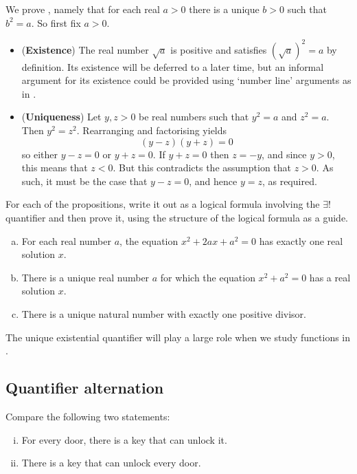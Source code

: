 \begin{example}
\label{exEveryPositiveRealHasUniqueSquareRootProof}
We prove , namely that for each real $a>0$ there is a unique $b>0$ such that $b^2=a$. So first fix $a > 0$.
\begin{itemize}
\item (\textbf{Existence}) The real number $\sqrt{a}$ is positive and satisfies $(\sqrt{a})^2=a$ by definition. Its existence will be deferred to a later time, but an informal argument for its existence could be provided using `number line' arguments as in .
\item (\textbf{Uniqueness}) Let $y,z > 0$ be real numbers such that $y^2=a$ and $z^2=a$. Then $y^2=z^2$. Rearranging and factorising yields
\[(y-z)(y+z)=0\]
so either $y-z=0$ or $y+z=0$. If $y+z=0$ then $z=-y$, and since $y>0$, this means that $z<0$. But this contradicts the assumption that $z>0$. As such, it must be the case that $y-z=0$, and hence $y=z$, as required.
\end{itemize}
\end{example}

\begin{exercise}
\label{exExamplesOfUniqueExistentialQuantifier}
For each of the propositions, write it out as a logical formula involving the $\exists !$ quantifier and then prove it, using the structure of the logical formula as a guide.
\begin{enumerate}[(a)]
\item For each real number $a$, the equation $x^2+2ax+a^2=0$ has exactly one real solution $x$.
\item There is a unique real number $a$ for which the equation $x^2+a^2=0$ has a real solution $x$.
\item There is a unique natural number with exactly one positive divisor.
\end{enumerate}
\end{exercise}

The unique existential quantifier will play a large role when we study functions in .

\subsection*{Quantifier alternation}
Compare the following two statements:
\begin{enumerate}[(i)] 
\item For every door, there is a key that can unlock it.
\item There is a key that can unlock every door.
\end{enumerate}

